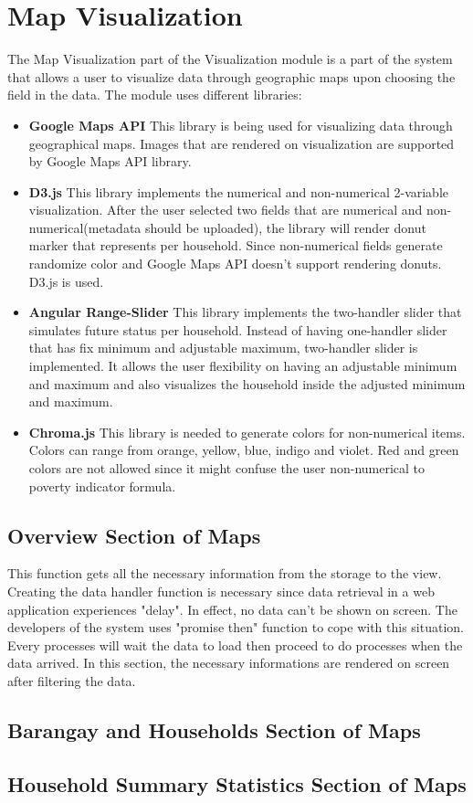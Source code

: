 \section{Map Visualization}
The Map Visualization part of the Visualization module is a part of the system that allows a user to visualize data through geographic maps upon choosing the field in the data. The module uses different libraries: 
\begin{itemize}
	\item \textbf{Google Maps API}
	This library is being used for visualizing data through geographical maps. Images that are rendered on visualization are supported by Google Maps API library. 
	\item \textbf{D3.js}
	This library implements the numerical and non-numerical 2-variable visualization. After the user selected two fields that are numerical and non-numerical(metadata should be uploaded), the library will render donut marker that represents per household. Since non-numerical fields generate randomize color and Google Maps API doesn't support rendering donuts. D3.js is used. 
	
	\item \textbf{Angular Range-Slider}
	This library implements the two-handler slider that simulates future status per household. Instead of having one-handler slider that has fix minimum and adjustable maximum, two-handler slider is implemented. It allows the user flexibility on having an adjustable minimum and maximum and also visualizes the household inside the adjusted minimum and maximum. 
	
	\item \textbf{Chroma.js}
	This library is needed to generate colors for non-numerical items. Colors can range from orange, yellow, blue, indigo and violet. Red and green colors are not allowed since it might confuse the user non-numerical to poverty indicator formula.
\end{itemize}
\subsection{Overview Section of Maps}

This function gets all the necessary information from the storage to the view. Creating the data handler function is necessary since data retrieval in a web application experiences "delay". In effect, no data can't be shown on screen. The developers of the system uses "promise then" function to cope with this situation. Every processes will wait the data to load then proceed to do processes when the data arrived. In this section, the necessary informations are rendered on screen after filtering the data.
\subsection{Barangay and Households Section of Maps}
\subsection{Household Summary Statistics Section of Maps}
\clearpage